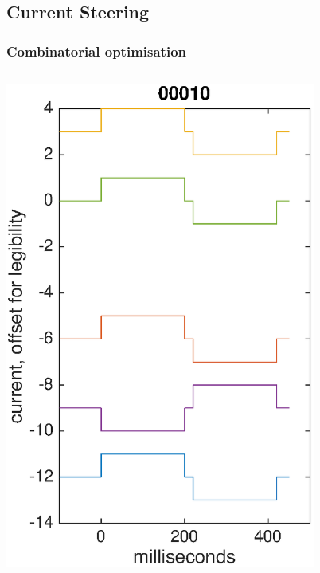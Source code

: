 \documentclass{beamer}
\begin{document}
\subsection{Current Steering}


\begin{frame}
  \frametitle{Combinatorial optimisation}
  \begin{columns}
    \column{5 cm}
    \begin{center}
      \includegraphics[width=0.8\textwidth]{pulsedemo1}
    \end{center}
    \column{5 cm}
    \begin{center}

\end{center}
\end{columns}
\end{frame}
\end{document}
